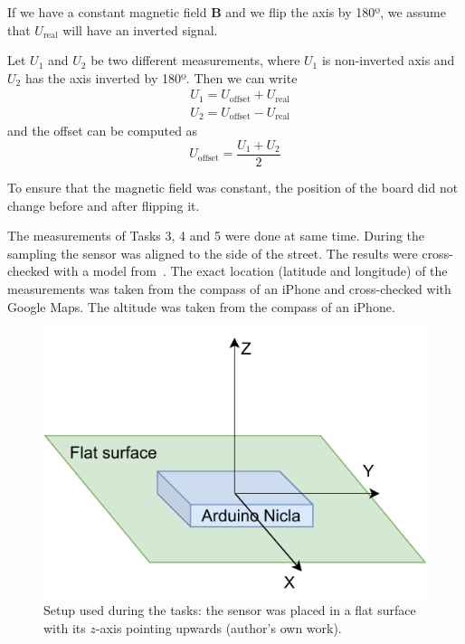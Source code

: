 \documentclass[DIV=14]{scrartcl}
\begin{document}
    If we have a constant magnetic field $\boldsymbol{B}$ and we flip the axis by 180º, we assume that $U_{\mathrm{real}}$ will
    have an inverted signal.

    Let $U_1$ and $U_2$ be two different measurements, where $U_1$ is non-inverted axis and $U_2$ has the axis inverted by 180º.
    Then we can write
    \begin{subequations}
        \begin{alignat}{1}
            & U_{1} = U_{\mathrm{offset}} + U_{\mathrm{real}}\\
            & U_{2} = U_{\mathrm{offset}} - U_{\mathrm{real}}
        \end{alignat}
    \end{subequations}
    and the offset can be computed as
    \begin{equation}
        U_{\mathrm{offset}} = \frac{U_{1} + U_{2}}{2}
        \label{eq:offset}
    \end{equation}

    To ensure that the magnetic field was constant, the position of the board did not change before and after
    flipping it.

    The measurements of Tasks 3, 4 and 5 were done at same time.
    During the sampling the sensor was aligned to the side of the street.
    The results were cross-checked with a model from~\cite{ngdc}.
    The exact location (latitude and longitude) of the measurements was taken from the compass of an iPhone and cross-checked with Google Maps.
    The altitude was taken from the compass of an iPhone.


    \vspace{3em}

    \begin{figure}[h]
        \centering
        \includegraphics[width=.6\textwidth]{figures/Setup1and2}
        \caption{Setup used during the tasks: the sensor was placed in a flat surface with its $z$-axis pointing upwards
            (author's own work).}
        \label{fig:setup}
    \end{figure}
\end{document}
